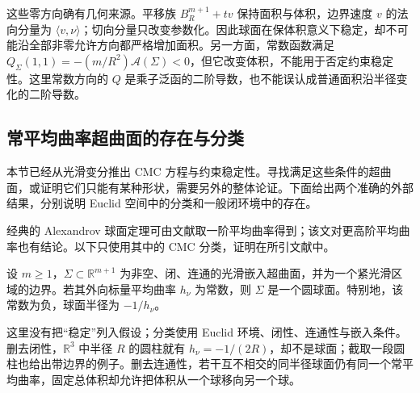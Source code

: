 这些零方向确有几何来源。平移族 \(B_R^{m+1}+tv\) 保持面积与体积，边界速度 \(v\) 的法向分量为 \(\langle v,\nu\rangle\)；切向分量只改变参数化。因此球面在保体积意义下稳定，却不可能沿全部非零允许方向都严格增加面积。另一方面，常数函数满足
\(Q_\Sigma(1,1)=-(m/R^2)\mathcal A(\Sigma)<0\)，但它改变体积，不能用于否定约束稳定性。这里常数方向的 \(Q\) 是乘子泛函的二阶导数，也不能误认成普通面积沿半径变化的二阶导数。

\subsection{常平均曲率超曲面的存在与分类}
\label{g3:subsec:1905:05}
本节已经从光滑变分推出 CMC 方程与约束稳定性。寻找满足这些条件的超曲面，或证明它们只能有某种形状，需要另外的整体论证。下面给出两个准确的外部结果，分别说明 Euclid 空间中的分类和一般闭环境中的存在。

\ProseParagraphBreak

经典的 Alexandrov 球面定理可由文献\cite[定理2，第450--451页]{Ros1987HigherMeanCurvatures}取一阶平均曲率得到；该文对更高阶平均曲率也有结论。以下只使用其中的 CMC 分类，证明在所引文献中。

\begin{theorem}\label{g3:thm:alexandrov-cmc-external}
	设 \(m\ge1\)，\(\Sigma\subset\mathbb R^{m+1}\) 为非空、闭、连通的光滑嵌入超曲面，并为一个紧光滑区域的边界。若其外向标量平均曲率 \(h_\nu\) 为常数，则 \(\Sigma\) 是一个圆球面。特别地，该常数为负，球面半径为 \(-1/h_\nu\)。
\end{theorem}

这里没有把“稳定”列入假设；分类使用 Euclid 环境、闭性、连通性与嵌入条件。删去闭性，\(\mathbb R^3\) 中半径 \(R\) 的圆柱就有 \(h_\nu=-1/(2R)\)，却不是球面；截取一段圆柱也给出带边界的例子。删去连通性，若干互不相交的同半径球面仍有同一个常平均曲率，固定总体积却允许把体积从一个球移向另一个球。

